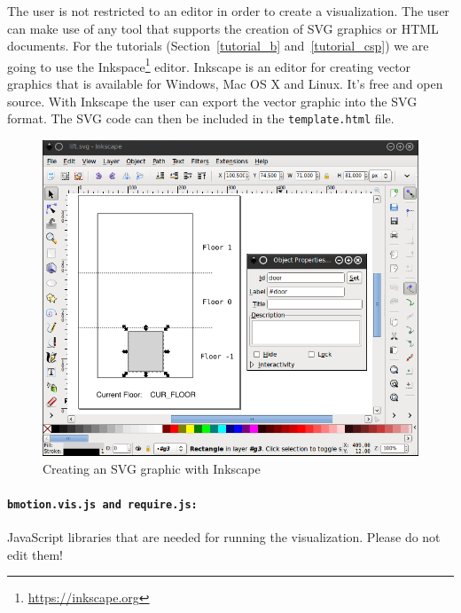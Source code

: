 
The user is not restricted to an editor in order to create a visualization.
The user can make use of any tool that supports the creation of SVG graphics or HTML documents.
For the tutorials (Section~\ref{tutorial_b} and~\ref{tutorial_csp}) we are going to use the Inkspace\footnote{\url{https://inkscape.org}} editor. Inkscape is an editor for creating vector graphics that is available for Windows, Mac OS X and Linux.
It's free and open source.
With Inkscape the user can export the vector graphic into the SVG format.
The SVG code can then be included in the \texttt{template.html} file.

\begin{figure}[!ht]
\begin{center}
	\includegraphics[width=12cm]{img/tutorial/tut_02.png}
	\caption{Creating an SVG graphic with Inkscape}
	\label{fig_tut_02_inkscape}
\end{center}
\end{figure} 

\paragraph{\texttt{bmotion.vis.js and require.js:}}
JavaScript libraries that are needed for running the visualization.
Please do not edit them!

